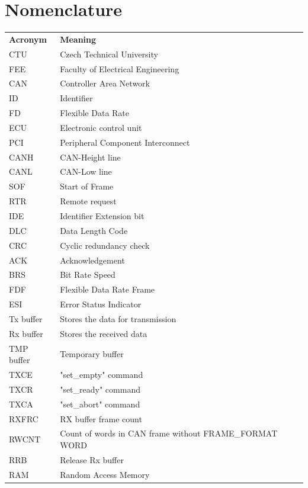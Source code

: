 \documentclass{ctuthesis}
\begin{document}
\maketitle
\chapter*{Nomenclature}

\noindent
\begin{tabularx}{\linewidth}
  { l >{\raggedright\arraybackslash}X }
\bfseries Acronym  & \bfseries Meaning \\\Midrule
CTU & Czech Technical University \\
FEE & Faculty of Electrical Engineering \\
CAN & Controller Area Network \\
ID & Identifier \\
FD & Flexible Data Rate \\
ECU & Electronic control unit \\
PCI & Peripheral Component Interconnect \\
CANH & CAN-Height line \\
CANL & CAN-Low line \\
SOF & Start of Frame \\
RTR & Remote request \\
IDE & Identifier Extension bit \\
DLC & Data Length Code \\
CRC & Cyclic redundancy check \\
ACK & Acknowledgement \\
BRS & Bit Rate Speed \\
FDF & Flexible Data Rate Frame \\
ESI & Error Status Indicator \\
Tx buffer & Stores the data for transmission \\
Rx buffer & Stores the received data \\
TMP buffer & Temporary buffer \\
TXCE & "set\_empty" command \\
TXCR & "set\_ready" command \\
TXCA & "set\_abort" command \\
RXFRC & RX buffer frame count \\
RWCNT & Count of words in CAN frame without FRAME\_FORMAT WORD \\
RRB & Release Rx buffer \\
RAM & Random Access Memory \\
\end{tabularx}
\end{document}

